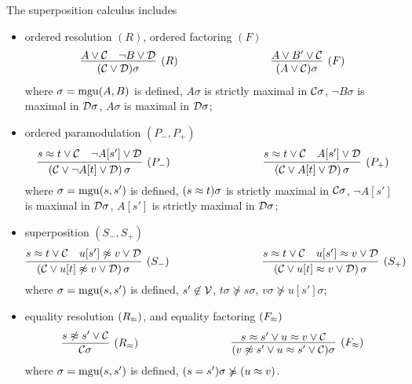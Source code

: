 
\begin{definition}\label{def:superposition-calculus}
	The {\myem superposition calculus} includes
	\begin{itemize}
		\item ordered resolution $(R)$,
		ordered factoring $(F)$
		\begin{gather*}
		\infer
		[(R)]
		{(\mcC \lor \mcD)\sigma}
		{{ A} \lor\mcC & { \lnot B} \lor\mcD}
		\hspace{3cm}
		\infer
		[(F)]
		{(A \lor \mcC)\sigma}
		{{ A}\lor B'\lor\mcC}
		\end{gather*}
		where
		$\sigma=\operatorname{mgu}(A,B)$ is defined, 
		$A\sigma$ { is strictly maximal} in ${\mathcal C}\sigma$,
		$\lnot B\sigma$ { is maximal} in ${\mathcal D}\sigma$, 
		$A\sigma$ is maximal in ${\mathcal D}\sigma$;
		\item ordered paramodulation $(P_-,P_+)$
		\[
		\infer
		[(P_-)]
		{(\mcC\lor \lnot A[t]\lor\mcD)\,\sigma}
		{{ s\mEQ t} \lor\mcC\quad { \lnot A[s']}\lor\mcD}
		\hspace{3cm}
		\infer
		[(P_+)]
		{(\mcC\lor A[t]\lor\mcD)\,\sigma}
		{{ s\mEQ t} \lor\mcC\quad { A[s']}\lor\mcD}
		\]
		where $\sigma=\operatorname{mgu}(s,s')$ is defined, 
		$(s\approx t)\sigma$ { is strictly maximal} in ${\mathcal C}\sigma$, 
		$\lnot A[s']$ { is maximal} in ${\mathcal D}\sigma$,
		$A[s']$ { is strictly maximal} in ${\mathcal D}\sigma$;
		\item superposition $(S_-,S_+)$
		\[
		\infer
		[(S_-)]
		{(\mcC\lor u[t]\mNE v\lor\mcD)\,\sigma}
		{{ s\mEQ t}\lor\mcC\quad { u[s']\mNE v}\lor\mcD}
		\hspace{3cm}
		\infer
		[(S_+)]
		{(\mcC\lor u[t]\mEQ v\lor\mcD)\,\sigma}
		{{ s\mEQ t}\lor\mcC\quad { u[s']\mEQ v}\lor\mcD}
		\]
		where $\sigma=\operatorname{mgu}(s,s')$ is defined,
		$s'\not\in{\mathcal V}$, 
		$t\sigma\not\succcurlyeq s\sigma$,
		$v\sigma\not\succcurlyeq u[s']\sigma$;
		\item 
		equality resolution $(R_\approx )$,
		and equality factoring $(F_\approx )$
		\[
		\infer
		[(R_\mEQ)]
		{\mcC\sigma}
		{{ s\mNE s'}\lor\mcC}
		\hspace{3cm}
		\infer
		[(F_\mEQ)]
		{(v\mNE s'\lor u\mEQ s'\lor\mcC)\sigma}
		{{s\mEQ s'}\lor { u\mEQ v}\lor\mcC}
		\]
		where 
		$\sigma=\operatorname{mgu}(s,s')$ is defined,
		$(s=s')\sigma\not\succcurlyeq(u\approx v)$.
	\end{itemize}
\end{definition}
